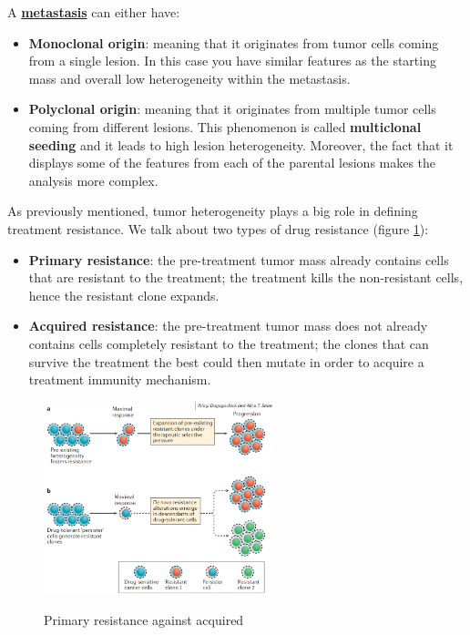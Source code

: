   A \underline{\textbf{metastasis}} can either have:
  \begin{itemize}
    \item \textbf{Monoclonal origin}: meaning that it originates from tumor
    cells coming from a single lesion. In this case you have similar features as
    the starting mass and overall low heterogeneity within the metastasis.
    \item \textbf{Polyclonal origin}: meaning that it originates from multiple
    tumor cells coming from different lesions. This phenomenon is called
    \textbf{multiclonal seeding} and it leads to high lesion heterogeneity.
    Moreover, the fact that it displays some of the features from each of the
    parental lesions makes the analysis more complex.
  \end{itemize}
  
  As previously mentioned, tumor heterogeneity plays a big role in defining
  treatment resistance. We talk about two types of drug resistance (figure
  \ref{fig: tumor resistance}):
  \begin{itemize}
    \item \textbf{Primary resistance}: the pre-treatment tumor mass already
    contains cells that are resistant to the treatment; the treatment kills the
    non-resistant cells, hence the resistant clone expands. 
    \item \textbf{Acquired resistance}: the pre-treatment tumor mass does not
    already contains cells completely resistant to the treatment; the clones
    that can survive the treatment the best could then mutate in order to
    acquire a treatment immunity mechanism. 
  \end{itemize}

  \begin{figure}[H]
    \caption{Primary resistance against acquired}
    \centering
    \includegraphics[width=0.6\textwidth]{image_08.PNG}
    \label{fig: tumor resistance}
  \end{figure}

